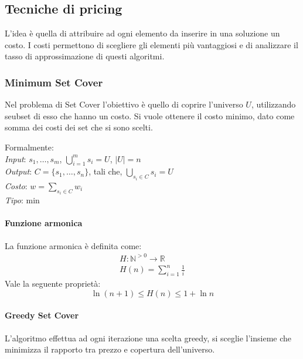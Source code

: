 \subsection{Tecniche di pricing}
L'idea è quella di attribuire ad ogni elemento da inserire in 
una soluzione un costo. I costi permettono di scegliere gli elementi 
più vantaggiosi e di analizzare il tasso di approssimazione di questi algoritmi.

\subsubsection{Minimum Set Cover}
Nel problema di Set Cover l'obiettivo è quello di coprire l'universo $U$, 
utilizzando seubset di esso che hanno un costo. Si vuole ottenere il costo
minimo, dato come somma dei costi dei set che si sono scelti.

Formalmente: \\
\emph{Input}: $s_1, \dots, s_m$, $\bigcup_{i=1}^m s_i = U$, $|U| = n$\\
\emph{Output}: $C = \{s_1, \dots, s_n\}$, tali che, $\bigcup_{s_i \in C} s_i = U$\\
\emph{Costo}: $w = \sum_{s_i \in C} w_i$\\
\emph{Tipo}: min\\

\paragraph{Funzione armonica}
La funzione armonica è definita come: 
\begin{equation}
    \begin{aligned}
        H: \mathbb{N}^{>0} \rightarrow \mathbb{R}\\
        H(n) = \sum_{i = 1}^{n} \frac{1}{i}  
    \end{aligned}
\end{equation}
Vale la seguente proprietà: 
$$\ln (n+1) \leq H(n) \leq 1 +\ln n$$

\paragraph{Greedy Set Cover}
L'algoritmo effettua ad ogni iterazione una scelta greedy, 
si sceglie l'insieme che minimizza il rapporto tra prezzo e copertura 
dell'universo.

